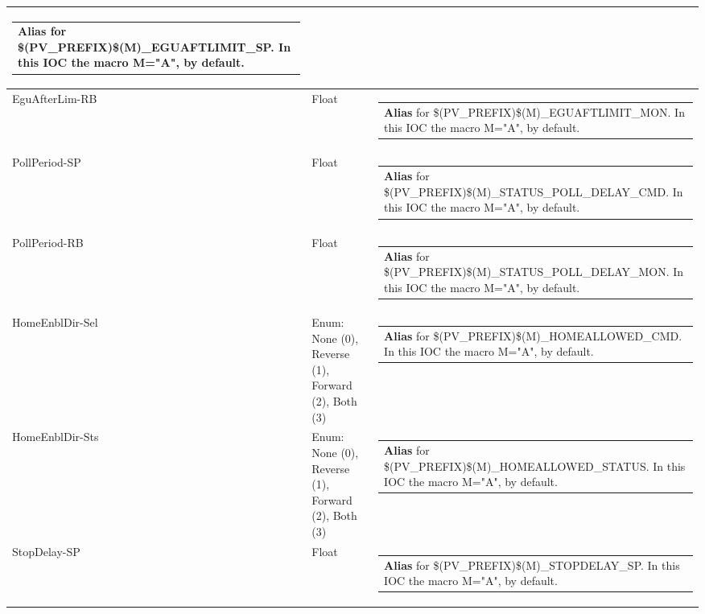 \documentclass[openany]{article}
\begin{document}
\begin{longtable}{| m{4.5cm} m{2.5cm}  m{8.5cm} |}
\begin{tabular}{@{}m{6cm}@{}}
                \textbf{\color{blue} Alias} for \$(PV\_PREFIX)\$(M)\_EGUAFTLIMIT\_SP. In this IOC the macro M="A", by default.
            \end{tabular} \hypertarget{}{}\\ \hline
        EguAfterLim-RB & Float & \begin{tabular}{@{}m{6cm}@{}}
                \textbf{\color{blue} Alias} for \$(PV\_PREFIX)\$(M)\_EGUAFTLIMIT\_MON. In this IOC the macro M="A", by default.
            \end{tabular} \hypertarget{pv:poll-period}{}\\ \hline
        PollPeriod-SP & Float & \begin{tabular}{@{}m{6cm}@{}}
                \textbf{\color{blue} Alias} for \$(PV\_PREFIX)\$(M)\_STATUS\_POLL\_DELAY\_CMD. In this IOC the macro M="A", by default.
            \end{tabular} \hypertarget{}{}\\ \hline
        PollPeriod-RB & Float & \begin{tabular}{@{}m{6cm}@{}}
                \textbf{\color{blue} Alias} for \$(PV\_PREFIX)\$(M)\_STATUS\_POLL\_DELAY\_MON. In this IOC the macro M="A", by default.
            \end{tabular} \hypertarget{pv:home-enbl-dir}{}\\ \hline
        HomeEnblDir-Sel & Enum: None (0), Reverse (1), Forward (2), Both (3) & \begin{tabular}{@{}m{6cm}@{}}
                \textbf{\color{blue} Alias} for \$(PV\_PREFIX)\$(M)\_HOMEALLOWED\_CMD. In this IOC the macro M="A", by default.
            \end{tabular} \hypertarget{}{}\\ \hline
        HomeEnblDir-Sts & Enum: None (0), Reverse (1), Forward (2), Both (3) & \begin{tabular}{@{}m{6cm}@{}}
                \textbf{\color{blue} Alias} for \$(PV\_PREFIX)\$(M)\_HOMEALLOWED\_STATUS. In this IOC the macro M="A", by default.
            \end{tabular} \hypertarget{pv:stop-delay}{}\\ \hline
        StopDelay-SP & Float & \begin{tabular}{@{}m{6cm}@{}}
                \textbf{\color{blue} Alias} for \$(PV\_PREFIX)\$(M)\_STOPDELAY\_SP. In this IOC the macro M="A", by default.
            \end{tabular} \hypertarget{}{}\\ \hline

\end{longtable}
\end{document}
